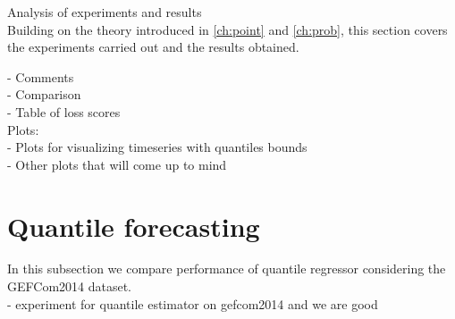 Analysis of experiments and results
\\
Building on the theory introduced in \ref{ch:point} and \ref{ch:prob}, this section covers the experiments carried out and the results obtained.

- Comments
\\
- Comparison
\\
- Table of loss scores
\\
Plots:
\\
- Plots for visualizing timeseries with quantiles bounds
\\
- Other plots that will come up to mind

\section{Quantile forecasting}
In this subsection we compare performance of quantile regressor considering the GEFCom2014 dataset.
\\
- experiment for quantile estimator on gefcom2014 and we are good

